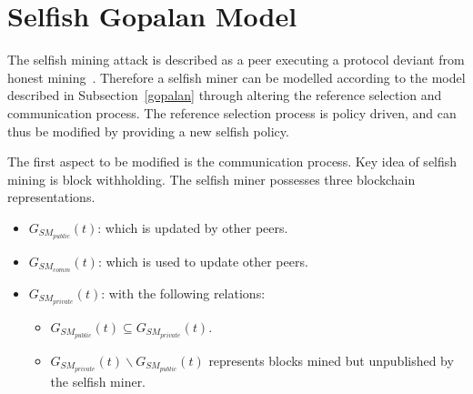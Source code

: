 \section{Selfish Gopalan Model}\label{selfishmodel}
The selfish mining attack is described as a peer executing a protocol deviant from honest mining~\citep{eyal}. Therefore a selfish miner can be modelled according to the model described in Subsection~\ref{gopalan} through altering the reference selection and communication process. The reference selection process is policy driven, and can thus be modified by providing a new selfish policy. 

The first aspect to be modified is the communication process. 
Key idea of selfish mining is block withholding. The selfish miner possesses three blockchain representations. 
\begin{itemize}
\item $G_{SM_{public}}(t)$: which is updated by other peers.
\item $G_{SM_{comm}}(t)$: which is used to update other peers.
\item $G_{SM_{private}}(t)$: with the following relations:
		\begin{itemize}
		\item $G_{SM_{public}}(t)\subseteq G_{SM_{private}}(t)$.
		\item $G_{SM_{private}}(t)\backslash G_{SM_{public}}(t)$ represents blocks mined but unpublished by the selfish miner.
\end{itemize}		
\end{itemize}


